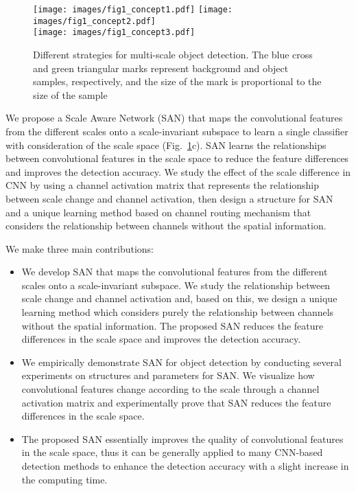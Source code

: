 \documentclass[runningheads]{llncs}
\begin{document}
\begin{figure}[t]
	\texttt{[image: images/fig1\_concept1.pdf]}
	\texttt{[image: images/fig1\_concept2.pdf]}\\
	\texttt{[image: images/fig1\_concept3.pdf]}
	\caption{Different strategies for multi-scale object detection. The blue cross and green triangular marks represent background and object samples, respectively, and the size of the mark is proportional to the size of the sample}
	\centering
	\label{fig:SAN_CONCEPTS}
\end{figure}


We propose a Scale Aware Network (SAN) that maps the convolutional features from the different scales onto a scale-invariant subspace to learn a single classifier with consideration of the scale space (Fig.~\ref{fig:SAN_CONCEPTS}c).
SAN learns the relationships between convolutional features in the scale space to reduce the feature differences and improves the detection accuracy.
We study the effect of the scale difference in CNN by using a channel activation matrix that represents the relationship between scale change and channel activation,
then design a structure for SAN and a unique learning method based on channel routing mechanism that considers the relationship between channels without the spatial information.

We make three main contributions:
\begin{itemize}[leftmargin=+.4in,label=$\bullet$]
	\item We develop SAN that maps the convolutional features from the different scales onto a scale-invariant subspace.
	We study the relationship between scale change and channel activation and, based on this,
	we design a unique learning method which considers purely the relationship between channels without the spatial information.
	The proposed SAN reduces the feature differences in the scale space and improves the detection accuracy.

	\item We empirically demonstrate SAN for object detection by conducting several experiments on structures and parameters for SAN.
	We visualize how convolutional features change according to the scale through a channel activation matrix and
	experimentally prove that SAN reduces the feature differences in the scale space.


	\item The proposed SAN essentially improves the quality of convolutional features in the scale space,
	thus it can be generally applied to many CNN-based detection methods to enhance the detection accuracy with a slight increase in the computing time.
\end{itemize}
\end{document}
